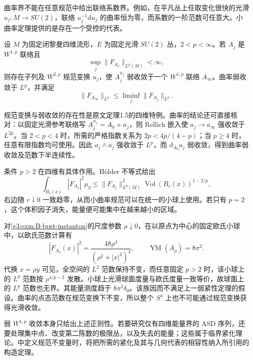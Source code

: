 \ProseParagraphBreak

曲率界不能在任意规范中给出联络系数界。例如，在平凡丛上任取变化很快的光滑 \(u_j:M\to SU(2)\)，联络 \(u_j^{-1}\mathrm du_j\) 的曲率恒为零，而系数的一阶范数可任意大。小曲率定理提供的是存在一个受控的代表。

\begin{theorem}\label{g3:thm:B-uhlenbeck-weak-compactness}
 设 \(M\) 为固定闭黎曼四维流形，\(E\) 为固定光滑 \(SU(2)\) 丛，\(2<p<\infty\)。若 \(A_j\) 是 \(W^{1,p}\) 联络且
 \[
  \sup_j\|F_{A_j}\|_{L^p(M)}<\infty,
 \]
 则存在子列及 \(W^{2,p}\) 规范变换 \(u_j\)，使 \(A_j^{u_j}\) 弱收敛于一个 \(W^{1,p}\) 联络 \(A_\infty\)。曲率弱收敛于 \(L^p\)，并满足
 \[
  \|F_{A_\infty}\|_{L^p}\le\liminf_j\|F_{A_j}\|_{L^p}.
 \]
\end{theorem}
规范变换与弱收敛的存在性是原文定理1.5的四维特例\cite[定理1.5，第34页]{Uhlenbeck1982LpCurvature}。曲率的结论还可直接核对：以固定光滑参考联络写 \(A_j^{u_j}=A_0+a_j\)，则 Rellich 嵌入使 \(a_j\to a_\infty\) 强收敛于 \(L^{2p}\)。当 \(2<p<4\) 时，所需的严格指数关系为 \(2p<4p/(4-p)\)；当 \(p\ge4\) 时，任意有限指数均可使用。因此 \(a_j\wedge a_j\) 强收敛于 \(L^p\)，而 \(\mathrm d_{A_0}a_j\) 弱收敛，得到曲率弱收敛及范数下半连续性。

\ProseParagraphBreak

条件 \(p>2\) 在四维有具体作用。Hölder 不等式给出
\[
 \int_{B_r(x)}|F_{A_j}|^2\mu_g
 \le \|F_{A_j}\|_{L^p(M)}^2
       \operatorname{Vol}(B_r(x))^{1-2/p},
\]
右边随 \(r\downarrow0\) 一致趋零，从而小曲率规范可以在统一的小球上使用。若只有 \(p=2\)，这个体积因子消失，能量便可能集中在越来越小的区域。

\begin{example}\label{g3:exm:B-instanton-concentration}
 对\cref{g3:exm:B-bpst-instanton}的尺度参数 \(\rho\downarrow0\)，在以原点为中心的固定欧氏小球中，以欧氏范数计算有
 \[
  |F_{A_\rho}(x)|^2=\frac{48\rho^4}{(\rho^2+|x|^2)^4},
  \qquad \operatorname{YM}(A_\rho)=8\pi^2.
 \]
 代换 \(x=\rho y\) 可见，全空间的 \(L^2\) 范数保持不变，而任意固定 \(p>2\) 时，该小球上的 \(L^p\) 范数按 \(\rho^{4/p-2}\) 发散。小球上光滑球面度量与欧氏度量一致等价，故球面上的 \(L^p\) 范数也无界。其能量测度趋于 \(8\pi^2\delta_0\)。该族因而不满足上一弱紧性定理的假设。曲率的点态范数在规范变换下不变，所以整个 \(S^4\) 上也不可能通过规范变换获得光滑收敛。
\end{example}

弱 \(W^{1,p}\) 收敛本身只给出上述正则性。若要研究仅有四维能量界的 ASD 序列，还要处理集中点、改变第二陈数的极限丛，以及失去的能量；这些属于临界紧化理论。中定义规范不变量时，将把所需的紧化及其与几何代表的相容性纳入所引用的构造定理。


